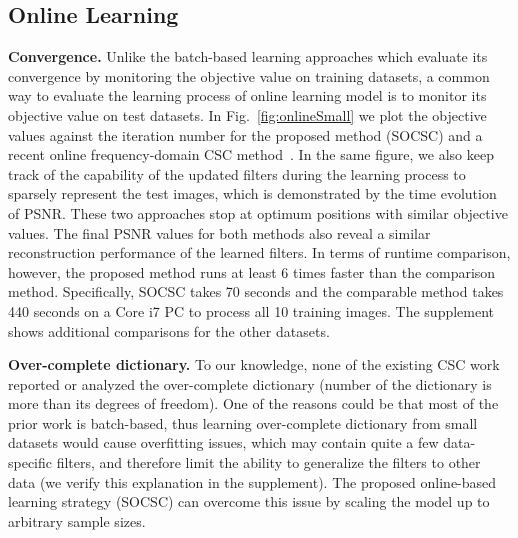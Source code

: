 \subsection{Online Learning}

{\bfseries Convergence.} Unlike the batch-based learning approaches
which evaluate its convergence by monitoring the objective value on
training datasets, a common way to evaluate the learning process of
online learning model is to monitor its objective value on test
datasets. In Fig.~\ref{fig:onlineSmall} we plot the objective values
against the iteration number for the proposed method (SOCSC) and a
recent online frequency-domain CSC method~\cite{liu-2018-first}. In
the same figure, we also keep track of the capability of the updated
filters during the learning process to sparsely represent the test
images, which is demonstrated by the time evolution of PSNR. These two
approaches stop at optimum positions with similar objective values.
The final PSNR values for both methods also reveal a similar
reconstruction performance of the learned filters. In terms of runtime
comparison, however, the proposed method runs at least $6$ times faster
than the comparison method. Specifically, SOCSC takes 70 seconds and the comparable method takes 440 seconds on a Core i7 PC to process all 10 training images. The supplement shows additional comparisons for the other datasets.


{\bfseries Over-complete dictionary.} To our knowledge, none of the
existing CSC work reported or analyzed the over-complete dictionary
(number of the dictionary is more than its degrees of freedom). One of
the reasons could be that most of the prior work is batch-based, thus
learning over-complete dictionary from small datasets would cause
overfitting issues, which may contain quite a few data-specific
filters, and therefore limit the ability to generalize the filters to
other data (we verify this explanation in the supplement). The
proposed online-based learning strategy (SOCSC) can overcome this
issue by scaling the model up to arbitrary sample sizes.

